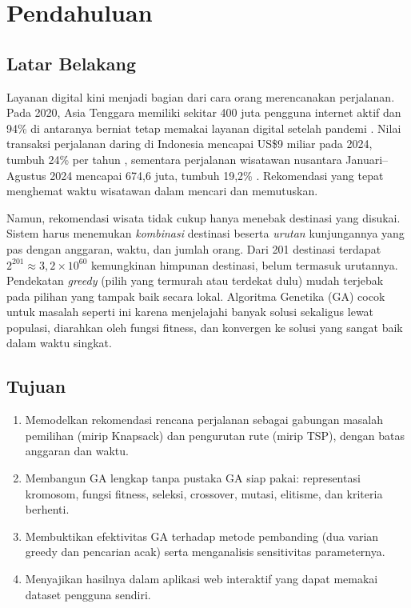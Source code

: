 \section{Pendahuluan}

\subsection{Latar Belakang}

Layanan digital kini menjadi bagian dari cara orang merencanakan perjalanan. Pada 2020, Asia Tenggara memiliki sekitar 400 juta pengguna internet aktif dan 94\% di antaranya berniat tetap memakai layanan digital setelah pandemi \cite{econ2020}. Nilai transaksi perjalanan daring di Indonesia mencapai US\$9 miliar pada 2024, tumbuh 24\% per tahun \cite{econ2024}, sementara perjalanan wisatawan nusantara Januari--Agustus 2024 mencapai 674,6 juta, tumbuh 19,2\% \cite{bps2024}. Rekomendasi yang tepat menghemat waktu wisatawan dalam mencari dan memutuskan.

Namun, rekomendasi wisata tidak cukup hanya menebak destinasi yang disukai. Sistem harus menemukan \emph{kombinasi} destinasi beserta \emph{urutan} kunjungannya yang pas dengan anggaran, waktu, dan jumlah orang. Dari 201 destinasi terdapat $2^{201} \approx 3{,}2 \times 10^{60}$ kemungkinan himpunan destinasi, belum termasuk urutannya. Pendekatan \textit{greedy} (pilih yang termurah atau terdekat dulu) mudah terjebak pada pilihan yang tampak baik secara lokal. Algoritma Genetika (GA) \cite{holland1975, goldberg1989} cocok untuk masalah seperti ini karena menjelajahi banyak solusi sekaligus lewat populasi, diarahkan oleh fungsi fitness, dan konvergen ke solusi yang sangat baik dalam waktu singkat.

\subsection{Tujuan}

\begin{enumerate}
  \item Memodelkan rekomendasi rencana perjalanan sebagai gabungan masalah pemilihan (mirip Knapsack) dan pengurutan rute (mirip TSP), dengan batas anggaran dan waktu.
  \item Membangun GA lengkap tanpa pustaka GA siap pakai: representasi kromosom, fungsi fitness, seleksi, crossover, mutasi, elitisme, dan kriteria berhenti.
  \item Membuktikan efektivitas GA terhadap metode pembanding (dua varian greedy dan pencarian acak) serta menganalisis sensitivitas parameternya.
  \item Menyajikan hasilnya dalam aplikasi web interaktif yang dapat memakai dataset pengguna sendiri.
\end{enumerate}

